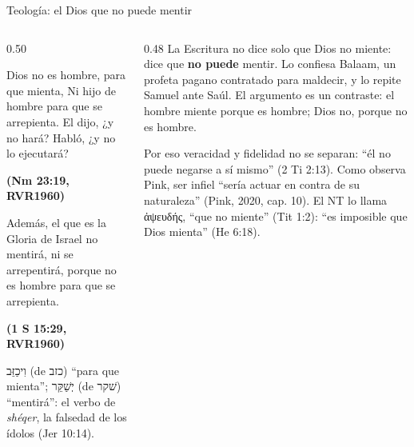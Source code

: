 \documentclass[hyperref={bookmarks=false},aspectratio=169]{beamer}
\newcommand{\heb}[1]{\mbox{\foreignlanguage{hebrew}{#1}}}
\newcommand{\grc}[1]{\foreignlanguage{ancientgreek}{#1}}
\newcommand{\fuente}[1]{\par\hfill{\upshape\bfseries\footnotesize\textcolor{azul}{#1}}}
\newcommand{\destacar}[1]{\textbf{\textcolor{azul}{#1}}}
\begin{document}
\begin{frame}{Teología: el Dios que no puede mentir}
\begin{columns}[t,onlytextwidth]
\begin{column}{0.50\textwidth}
\begin{cita}Dios no es hombre, para que mienta, Ni hijo de hombre para que se arrepienta. El dijo, ¿y no hará? Habló, ¿y no lo ejecutará?\fuente{(Nm 23:19, RVR1960)}\end{cita}
\begin{cita}Además, el que es la Gloria de Israel no mentirá, ni se arrepentirá, porque no es hombre para que se arrepienta.\fuente{(1 S 15:29, RVR1960)}\end{cita}
\scriptsize \heb{וִיכַזֵּב} (de \heb{כזב}) ``para que mienta''; \heb{יְשַׁקֵּר} (de \heb{שׁקר}) ``mentirá'': el verbo de \emph{shéqer}, la falsedad de los ídolos (Jer 10:14).
\end{column}
\begin{column}{0.48\textwidth}\small
La Escritura no dice solo que Dios no miente: dice que \destacar{no puede} mentir. Lo confiesa Balaam, un profeta pagano contratado para maldecir, y lo repite Samuel ante Saúl. El argumento es un contraste: el hombre miente porque es hombre; Dios no, porque no es hombre.\par\medskip
Por eso veracidad y fidelidad no se separan: ``él no puede negarse a sí mismo'' (2 Ti 2:13). Como observa Pink, ser infiel ``sería actuar en contra de su naturaleza'' (Pink, 2020, cap. 10). El NT lo llama \grc{ἀψευδής}, ``que no miente'' (Tit 1:2): ``es imposible que Dios mienta'' (He 6:18).
\end{column}
\end{columns}
\end{frame}
\end{document}
